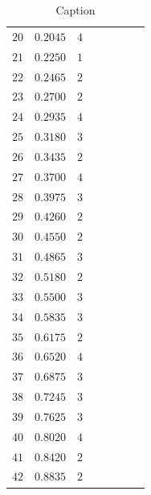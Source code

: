 \documentclass[12pt, a4paper]{article}
\begin{document}
\begin{table}[!htb]
{\begin{tabular}{|c|c|c|c|c|c|c|c|}
    \footnotesize $20 $& \footnotesize$0.2045$& $4$& &&&&\\
    \footnotesize $21 $&\footnotesize $0.2250$& $1$& &&&&\\
    \footnotesize $22 $& \footnotesize$0.2465$& $2$& &&&&\\
    \footnotesize $23 $& \footnotesize$0.2700$& $2$& &&&&\\
    \footnotesize $24 $& \footnotesize$0.2935$& $4$& &&&&\\
    \footnotesize $25 $& \footnotesize$0.3180$& $3$& &&&&\\
    \footnotesize $26 $& \footnotesize$0.3435$& $2$& &&&&\\
    \footnotesize $27 $& \footnotesize$0.3700$& $4$& &&&&\\
    \footnotesize $28 $& \footnotesize$0.3975$& $3$& &&&&\\
    \footnotesize $29 $& \footnotesize$0.4260$& $2$& &&&&\\
    \footnotesize $30 $& \footnotesize$0.4550$& $2$& &&&&\\ 
    \footnotesize $31 $& \footnotesize$0.4865$& $3$& &&&&\\
    \footnotesize $32 $& \footnotesize$0.5180$& $2$& &&&&\\
    \footnotesize $33 $& \footnotesize$0.5500$& $3$& &&&&\\
    \footnotesize $34 $& \footnotesize$0.5835$& $3$& &&&&\\
    \footnotesize $35 $& \footnotesize$0.6175$& $2$& &&&&\\
    \footnotesize $36 $& \footnotesize$0.6520$& $4$& &&&&\\
    \footnotesize $37 $& \footnotesize$0.6875$& $3$& &&&&\\
    \footnotesize $38 $& \footnotesize$0.7245$& $3$& &&&&\\
    \footnotesize $39 $& \footnotesize$0.7625$& $3$& &&&&\\
    \footnotesize $40 $& \footnotesize$0.8020$& $4$& &&&&\\
    \footnotesize $41 $&\footnotesize $0.8420$& $2$& &&&&\\
    \footnotesize $42$&\footnotesize $0.8835$ & $2$& &&&&\\
\hline
\end{tabular}}
  \caption{Caption}
  \label{Tabella Completa}
\end{table}
\end{document}
